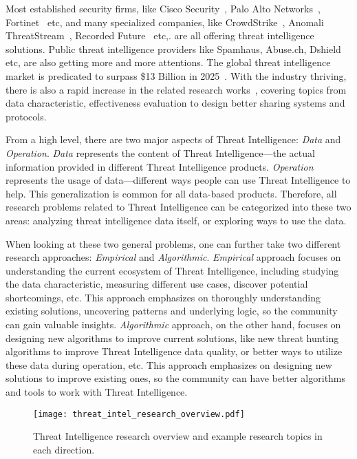 \begin{dissertationintroduction}
Most established security firms, like Cisco Security~\cite{ciscotalos}, 
Palo Alto Networks~\cite{panautofocus}, Fortinet~\cite{fortinet} etc, 
and many specialized companies, like CrowdStrike~\cite{crowdstrike}, 
Anomali ThreatStream~\cite{anomali}, Recorded Future~\cite{recordedfuture}
etc,. are all offering threat intelligence solutions. Public threat
intelligence providers like Spamhaus, Abuse.ch, Dshield etc, are also 
getting more and more attentions. The global threat intelligence market is
predicated to surpass \$13 Billion in 2025~\cite{tipredict2018}. With the
industry thriving, there is also a rapid increase in the related research
works~\cite{tounsi2018survey}, covering topics from data characteristic,
effectiveness evaluation to design better sharing systems and protocols.

From a high level, there are two major aspects of Threat Intelligence: 
\textit{Data} and \textit{Operation}. \textit{Data} represents the content 
of Threat Intelligence---the actual information provided in different Threat
Intelligence products. \textit{Operation} represents the usage of 
data---different ways people can use Threat Intelligence to help. This
generalization is common for all data-based products. Therefore,
all research problems related to Threat Intelligence can be categorized into
these two areas: analyzing threat intelligence data itself, or exploring
ways to use the data.

When looking at these two general problems, one can further 
take two different research approaches: \textit{Empirical} and 
\textit{Algorithmic}. \textit{Empirical} approach focuses on understanding
the current ecosystem of Threat Intelligence, including studying the 
data characteristic, measuring different use cases, discover potential 
shortcomings, etc. This approach emphasizes on thoroughly understanding
existing solutions, uncovering patterns and underlying logic, 
so the community can gain valuable insights.
\textit{Algorithmic} approach, on the other hand, 
focuses on designing new algorithms to 
improve current solutions, like new threat hunting algorithms to improve 
Threat Intelligence data quality, or better ways to utilize these data 
during operation, etc. This approach emphasizes on designing new solutions 
to improve existing ones, so the community can have better algorithms and
tools to work with Threat Intelligence.

\begin{figure}
\centering
\texttt{[image: threat\_intel\_research\_overview.pdf]}
\caption{Threat Intelligence research overview and example research
topics in each direction.}
\label{fig:threat_intel_overview}
\end{figure}


\end{dissertationintroduction}
